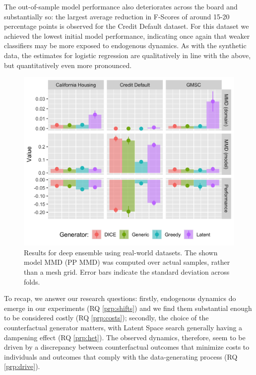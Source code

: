 \documentclass[conference,final,]{IEEEtran}
\theoremstyle{definition}
\theoremstyle{definition}
\theoremstyle{definition}
\theoremstyle{definition}
\theoremstyle{remark}
\begin{document}
The out-of-sample model performance also deteriorates across the board and substantially so: the largest average reduction in F-Scores of around 15-20 percentage points is observed for the Credit Default dataset. For this dataset we achieved the lowest initial model performance, indicating once again that weaker classifiers may be more exposed to endogenous dynamics. As with the synthetic data, the estimates for logistic regression are qualitatively in line with the above, but quantitatively even more pronounced.

\begin{figure}

{\centering \includegraphics[width=0.9\linewidth]{www/real_world_results} 

}

\caption{Results for deep ensemble using real-world datasets. The shown model MMD (PP MMD) was computed over actual samples, rather than a mesh grid. Error bars indicate the standard deviation across folds.}\label{fig:real}
\end{figure}

To recap, we answer our research questions: firstly, endogenous dynamics do emerge in our experiments (RQ \ref{prp:shifts}) and we find them substantial enough to be considered costly (RQ \ref{prp:costs}); secondly, the choice of the counterfactual generator matters, with Latent Space search generally having a dampening effect (RQ \ref{prp:het}). The observed dynamics, therefore, seem to be driven by a discrepancy between counterfactual outcomes that minimize costs to individuals and outcomes that comply with the data-generating process (RQ \ref{prp:drive}).
\end{document}
